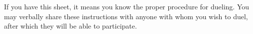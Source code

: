 \documentclass[green]{guildcamp4}
\begin{document}
\name{\gDuel{}}

If you have this sheet, it means you know the proper procedure for dueling. You may verbally share these instructions with anyone with whom you wish to duel, after which they will be able to participate.
\end{document}
